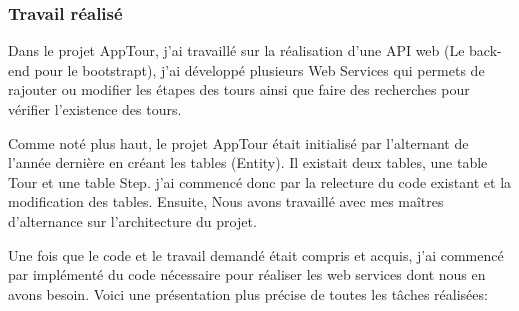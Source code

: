 \documentclass[12pt]{article}
\begin{document}
\newpage

\subsubsection{Travail réalisé}

Dans le projet AppTour, j'ai travaillé sur la réalisation d'une API web (Le back-end pour le bootstrapt), j'ai développé plusieurs Web Services qui permets de rajouter ou modifier les étapes des tours ainsi que faire des recherches pour vérifier l’existence des tours.

Comme noté plus haut, le projet AppTour était initialisé par l'alternant de l'année dernière en créant les tables (Entity). Il existait deux tables, une table Tour et une table Step. j'ai commencé donc par la relecture du code existant et la modification des tables.
Ensuite, Nous avons travaillé avec mes maîtres d'alternance sur l'architecture du projet.

Une fois que le code et le travail demandé était compris et acquis, j'ai commencé par implémenté du code nécessaire pour réaliser les web services dont nous en avons besoin. Voici une présentation plus précise de toutes les tâches réalisées:
\end{document}
